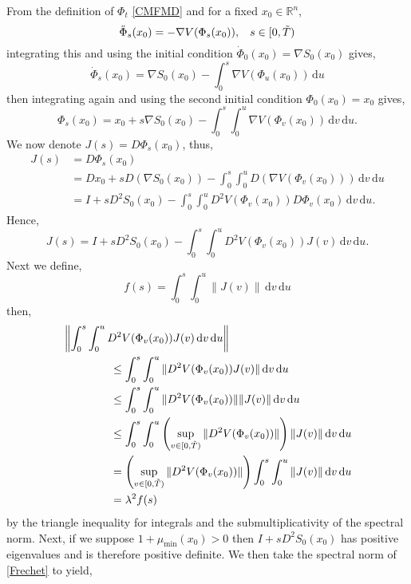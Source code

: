 \documentclass[a4paper,12pt,draft]{report}
\begin{document}
{
From the definition of $\Phi_t$ \eqref{CMFMD} and for a fixed $x_0 \in \mathbb{R}^n$,
$$
\ddot{\Phi}_s(x_0) = -\nabla V(\Phi_s(x_0)), \hspace{0.3cm} s \in [0, \tilde{T})
$$
integrating this and using the initial condition $\dot{\Phi}_0(x_0) = \nabla S_0(x_0)$ gives,
$$
\dot{\Phi}_s(x_0) = \nabla S_0(x_0) - \int_0^s\nabla V(\Phi_u(x_0))\,\mathrm{d}u
$$
then integrating again and using the second initial condition $\Phi_0(x_0) = x_0$ gives,
$$
\Phi_s(x_0) = x_0 + s\nabla S_0(x_0) - \int_0^s\int_0^u \nabla V(\Phi_v(x_0))\,\mathrm{d}v\,\mathrm{d}u.
$$
We now denote $J(s) = D\Phi_s(x_0)$, thus,
\begin{align}
J(s) & = D\Phi_s(x_0)\nonumber\\
& = Dx_0 + sD(\nabla S_0(x_0)) - \int_0^s\int_0^u D(\nabla V(\Phi_v(x_0)))\,\mathrm{d}v\,\mathrm{d}u\nonumber\\
& = I + sD^2S_0(x_0) - \int_0^s\int_0^u D^2V(\Phi_v(x_0))D\Phi_v(x_0)\,\mathrm{d}v\,\mathrm{d}u.\nonumber
\end{align}
Hence,
\begin{equation}
J(s) = I + sD^2S_0(x_0) - \int_0^s\int_0^u D^2V(\Phi_v(x_0))J(v)\,\mathrm{d}v\,\mathrm{d}u. \label{Frechet}
\end{equation}
Next we define,
$$
f(s) = \int_0^s\int_0^u \|J(v)\|\,\mathrm{d}v\,\mathrm{d}u
$$
then,
\begin{align}
& \left\|\int_0^s\int_0^u D^2V(\Phi_v(x_0))J(v)\,\mathrm{d}v\,\mathrm{d}u\right\|\nonumber\\
& \hspace{1.5cm} \le \int_0^s\int_0^u \|D^2V(\Phi_v(x_0))J(v)\|\,\mathrm{d}v\,\mathrm{d}u\nonumber\\
& \hspace{1.5cm} \le \int_0^s\int_0^u \|D^2V(\Phi_v(x_0))\|\|J(v)\|\,\mathrm{d}v\,\mathrm{d}u\nonumber\\
& \hspace{1.5cm} \le \int_0^s\int_0^u \left(\sup_{v \in [0, \tilde{T})}\|D^2V(\Phi_v(x_0))\|\right)\|J(v)\|\,\mathrm{d}v\,\mathrm{d}u\nonumber\\
& \hspace{1.5cm} = \left(\sup_{v \in [0, \tilde{T})}\|D^2V(\Phi_v(x_0))\|\right) \int_0^s\int_0^u \|J(v)\|\,\mathrm{d}v\,\mathrm{d}u\nonumber\\
& \hspace{1.5cm} = \lambda^2 f(s)\nonumber
\end{align}
by the triangle inequality for integrals and the submultiplicativity of the spectral norm.  Next, if we suppose $1 + \mu_{\mathrm{min}}(x_0) > 0$ then $ I + sD^2S_0(x_0)$ has positive eigenvalues and is therefore positive definite.  We then take the spectral norm of \eqref{Frechet} to yield,
}
\end{document}
